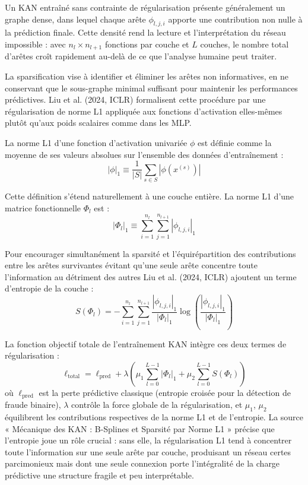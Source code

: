 \documentclass[11pt,a4paper,oneside]{report}
\theoremstyle{definition}
\theoremstyle{remark}
\begin{document}
Un KAN entraîné sans contrainte de régularisation présente généralement un graphe dense, dans lequel chaque arête $\phi_{l,j,i}$ apporte une contribution non nulle à la prédiction finale. Cette densité rend la lecture et l'interprétation du réseau impossible : avec $n_l \times n_{l+1}$ fonctions par couche et $L$ couches, le nombre total d'arêtes croît rapidement au-delà de ce que l'analyse humaine peut traiter.

La sparsification vise à identifier et éliminer les arêtes non informatives, en ne conservant que le sous-graphe minimal suffisant pour maintenir les performances prédictives. Liu et al. (2024, ICLR) formalisent cette procédure par une régularisation de norme L1 appliquée aux fonctions d'activation elles-mêmes plutôt qu'aux poids scalaires comme dans les MLP.

La norme L1 d'une fonction d'activation univariée $\phi$ est définie comme la moyenne de ses valeurs absolues sur l'ensemble des données d'entraînement :
\begin{equation}
|\phi|_1 \equiv \frac{1}{|S|} \sum_{s \in S} |\phi(x^{(s)})|
\end{equation}

Cette définition s'étend naturellement à une couche entière. La norme L1 d'une matrice fonctionnelle $\Phi_l$ est :
\begin{equation}
|\Phi_l|_1 \equiv \sum_{i=1}^{n_l} \sum_{j=1}^{n_{l+1}} |\phi_{l,j,i}|_1
\end{equation}

Pour encourager simultanément la sparsité et l'équirépartition des contributions entre les arêtes survivantes  évitant qu'une seule arête concentre toute l'information au détriment des autres  Liu et al. (2024, ICLR) ajoutent un terme d'entropie de la couche :
\begin{equation}
S(\Phi_l) = -\sum_{i=1}^{n_l} \sum_{j=1}^{n_{l+1}} \frac{|\phi_{l,j,i}|_1}{|\Phi_l|_1} \log\left(\frac{|\phi_{l,j,i}|_1}{|\Phi_l|_1}\right)
\end{equation}

La fonction objectif totale de l'entraînement KAN intègre ces deux termes de régularisation :
\begin{equation}
\ell_{\text{total}} = \ell_{\text{pred}} + \lambda \left(\mu_1 \sum_{l=0}^{L-1} |\Phi_l|_1 + \mu_2 \sum_{l=0}^{L-1} S(\Phi_l)\right)
\end{equation}
où $\ell_{\text{pred}}$ est la perte prédictive classique (entropie croisée pour la détection de fraude binaire), $\lambda$ contrôle la force globale de la régularisation, et $\mu_1$, $\mu_2$ équilibrent les contributions respectives de la norme L1 et de l'entropie. La source « Mécanique des KAN : B-Splines et Sparsité par Norme L1 » précise que l'entropie joue un rôle crucial : sans elle, la régularisation L1 tend à concentrer toute l'information sur une seule arête par couche, produisant un réseau certes parcimonieux mais dont une seule connexion porte l'intégralité de la charge prédictive  une structure fragile et peu interprétable.
\end{document}
